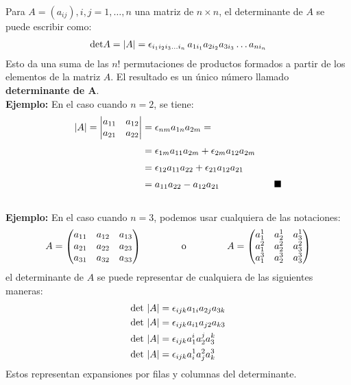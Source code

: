 \documentclass[hidelinks,12pt]{article}
\renewcommand{\qed}{\hfill\blacksquare}
\begin{document}
Para $A = (a_{ij}), i, j = 1, \ldots, n$ una matriz de $n \times n$, el determinante de $A$ se puede escribir como:
\begin{align*}
\text{det} A = \abs{A} = \epsilon_{i_{1} i_{2} i_{3} \ldots i_{n}} \, a_{1 i_{1}} a_{2 i_{2}} a_{3 i_{3}} \ldots a_{n i_{n}}
\end{align*}
Esto da una suma de las $n!$ permutaciones de productos formados a partir de los elementos de la matriz $A$. El resultado es un único número llamado \textbf{determinante de A}.
\\[0.5em]
\noindent
\textbf{Ejemplo:} En el caso cuando $n = 2$, se tiene:
\begin{align*}
\abs{A} = \mdet{
a_{11} & a_{12} \\
a_{21} & a_{22}
} &= \epsilon_{nm} a_{1n} a_{2m} = \\[0.25em]
&= \epsilon_{1m} a_{11} a_{2m} + \epsilon_{2m} a_{12} a_{2m} \\[0.25em]
&= \epsilon_{12} a_{11} a_{22} + \epsilon_{21} a_{12} a_{21} \\[0.25em]
&= a_{11} a_{22} - a_{12} a_{21} \hspace{2cm} \qed
\end{align*}
\\[0.5em]
\noindent
\textbf{Ejemplo:} En el caso cuando $n = 3$, podemos usar cualquiera de las notaciones:
\begin{align*}
A = \mqty(
a_{11} & a_{12} & a_{13} \\
a_{21} & a_{22} & a_{23} \\
a_{31} & a_{32} & a_{33})
\hspace{1.5cm} \text{o} \hspace{1.5cm}
A = \mqty(
a_{1}^{1} & a_{2}^{1} & a_{3}^{1} \\
a_{1}^{2} & a_{2}^{2} & a_{3}^{2} \\
a_{1}^{3} & a_{2}^{3} & a_{3}^{3})
\end{align*}
el determinante de $A$ se puede representar de cualquiera de las siguientes maneras:
\begin{align*}
\text{det } \abs{A} &= \epsilon_{ijk} a_{1i} a_{2j} a_{3k} \\
\text{det } \abs{A} &= \epsilon_{ijk} a_{i1} a_{j2} a_{k3} \\
\text{det } \abs{A} &= \epsilon_{ijk} a_{1}^{i} a_{2}^{j} a_{3}^{k} \\
\text{det } \abs{A} &= \epsilon_{ijk} a_{i}^{1} a_{j}^{2} a_{k}^{3}
\end{align*}
Estos representan expansiones por filas y columnas del determinante.
\end{document}
